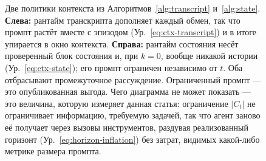 \begin{figure}[t]
{\begin{tikzpicture}
\end{tikzpicture}}
\caption{Две политики контекста из Алгоритмов~\ref{alg:transcript}
и~\ref{alg:state}. \textbf{Слева:} рантайм транскрипта дополняет каждый
обмен, так что промпт растёт вместе с эпизодом (Ур.~\ref{eq:ctx-transcript})
и в итоге упирается в окно контекста. \textbf{Справа:} рантайм состояния
несёт проверенный блок состояния и, при $k{=}0$, вообще никакой истории
(Ур.~\ref{eq:ctx-state}); его промпт ограничен независимо от $t$. Оба
отбрасывают промежуточное рассуждение. Ограниченный промпт — это
опубликованная выгода. Чего диаграмма не может показать — это величина,
которую измеряет данная статья: ограничение $|C_t|$ не ограничивает
информацию, требуемую задачей, так что агент заново её получает через
вызовы инструментов, раздувая реализованный горизонт
(Ур.~\ref{eq:horizon-inflation}) без затрат, видимых какой-либо метрике
размера промпта.}
\label{fig:architecture}
\end{figure}

